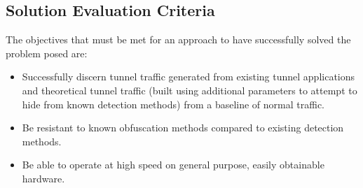 \documentclass{llncs}
\begin{document}
%
%

\subsection{Solution Evaluation Criteria}

The objectives that must be met for an
approach to have successfully solved the problem posed are:

\label{methodreqs}
\begin{itemize}
\item Successfully discern tunnel traffic generated from
existing tunnel applications and theoretical tunnel traffic (built using
additional parameters to attempt to hide from known detection methods) from a
baseline of normal traffic.
\item Be resistant to known obfuscation methods compared to existing detection methods.
\item Be able to operate at high speed on general purpose, easily obtainable
hardware.
\end{itemize}
\end{document}
